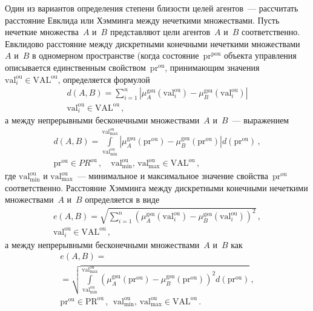 \begin{multicols}{2}
  Один из вариантов определения степени бли\-зости целей агентов~--- 
рассчитать расстояние Евклида или Хэмминга между нечеткими множествами. 
Пусть нечеткие множества~$A$ и~$B$ представляют цели агентов~$A$ и~$B$ 
соответственно. Евклидово расстояние между дискретными конечными 
нечеткими множествами~$A$ и~$B$ в одномерном пространстве (когда 
состояние~$\mathrm{pr}^{\mathrm{pou}}$ объекта управления описывается единственным 
свойством~$\mathrm{pr}^{\mathrm{ou}}$, при\-ни\-ма\-ющим значения  $\mathrm{val}_i^{\mathrm{ou}} \in
\mathrm{VAL}^{\mathrm{ou}}$, 
определяется формулой~\cite{15kir, 16kir}
  \begin{multline}
  d(A,B) = \sum\limits_{i=1}^n \left| \mu_A^{\mathrm{gsu}}\left(\mathrm{val}_i^{\mathrm{ou}}\right)-
\mu_B^{\mathrm{gsu}}\left(\mathrm{val}_i^{\mathrm{ou}}\right)\right| \\
 \mathrm{val}_i^{\mathrm{ou}} \in \mathrm{VAL}^{\mathrm{ou}}\,,
  \label{e3kir}
  \end{multline}
а между непрерывными бесконечными множествами~$A$ и~$B$~--- 
выражением
\begin{multline}
d(A,B) =  \int\limits_{\mathrm{val}_{\min}^{\mathrm{ou}}}^{\mathrm{val}^{\mathrm{ou}}_{\max}} \left\vert 
\mu_A^{\mathrm{gsu}}\left(\mathrm{pr}^{\mathrm{ou}}\right) 
-\mu_B^{\mathrm{gsu}}\left(\mathrm{pr}^{\mathrm{ou}}\right)\right\vert 
d(\mathrm{pr}^{\mathrm{ou}})\,,\\
\mathrm{pr}^{\mathrm{ou}}\in PR^{\mathrm{ou}}\,,\quad \mathrm{val}_{\min}^{\mathrm{ou}},\,\mathrm{val}_{\max}^{\mathrm{ou}}
 \in \mathrm{VAL}^{\mathrm{ou}}\,,
\label{e4kir}
\end{multline}
    где $\mathrm{val}_{\min}^{\mathrm{ou}}$ и $\mathrm{val}_{\max}^{\mathrm{ou}}$~--- минимальное и максимальное 
значение свойства~$\mathrm{pr}^{\mathrm{ou}}$ соответственно. Расстояние Хэмминга между 
дискретными конечными нечеткими множествами~$A$ и~$B$ определяется в виде
\begin{multline}
e(A,B) =  \sqrt{\sum\limits_{i=1}^n \left (\mu_A^{\mathrm{gsu}}\left(\mathrm{val}_i^{\mathrm{ou}}\right) -
\mu_B^{\mathrm{gsu}}\left(\mathrm{val}_i^{\mathrm{ou}}\right)\right )^2}\,, \\
 \mathrm{val}_i^{\mathrm{ou}}\in \mathrm{VAL}^{\mathrm{ou}}\,,
\label{e5kir}
\end{multline}
а между непрерывными бесконечными множествами~$A$ и~$B$ как
\begin{multline}
e(A,B) = {}\\
{}=
\sqrt{\int\limits_{\mathrm{val}_{\min}^{\mathrm{ou}}}^{\mathrm{val}_{\max}^{\mathrm{ou}}} \left 
(\mu_A^{\mathrm{gsu}}(\mathrm{pr}^{\mathrm{ou}})-\mu_B^{\mathrm{gsu}}(\mathrm{pr}^{\mathrm{ou}})\right )^2 
d(\mathrm{pr}^{\mathrm{ou}})}\,,\\ 
\mathrm{pr}^{\mathrm{ou}}\in \mathrm{PR}^{\mathrm{ou}}\,,\ \ \mathrm{val}_{\min}^{\mathrm{ou}},\,\mathrm{val}_{\max}^{\mathrm{ou}}
\in \mathrm{VAL}^{\mathrm{ou}}\,.
\label{e6kir}
\end{multline}


\end{multicols}
